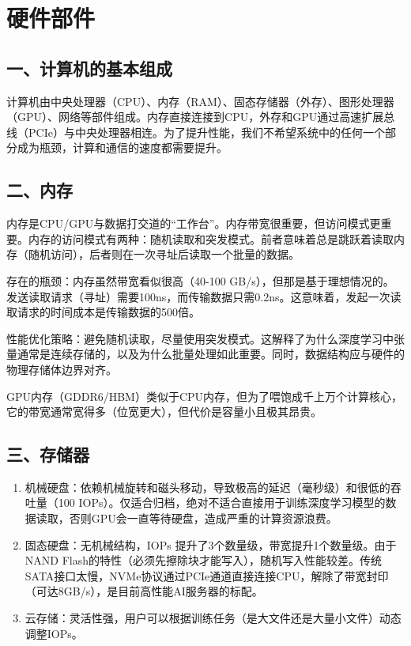 \setcounter{section}{0}

\hypertarget{ux786cux4ef6ux90e8ux4ef6}{%
\section{硬件部件}\label{ux786cux4ef6ux90e8ux4ef6}}

\hypertarget{ux4e00ux8ba1ux7b97ux673aux7684ux57faux672cux7ec4ux6210}{%
\subsection{一、计算机的基本组成}\label{ux4e00ux8ba1ux7b97ux673aux7684ux57faux672cux7ec4ux6210}}

计算机由中央处理器（CPU）、内存（RAM）、固态存储器（外存）、图形处理器（GPU）、网络等部件组成。内存直接连接到CPU，外存和GPU通过高速扩展总线（PCIe）与中央处理器相连。为了提升性能，我们不希望系统中的任何一个部分成为瓶颈，计算和通信的速度都需要提升。

\hypertarget{ux4e8cux5185ux5b58}{%
\subsection{二、内存}\label{ux4e8cux5185ux5b58}}

内存是CPU/GPU与数据打交道的``工作台''。内存带宽很重要，但访问模式更重要。内存的访问模式有两种：随机读取和突发模式。前者意味着总是跳跃着读取内存（随机访问），后者则在一次寻址后读取一个批量的数据。

存在的瓶颈：内存虽然带宽看似很高（40-100 GB/s），但那是基于理想情况的。发送读取请求（寻址）需要100ns，而传输数据只需0.2ns。这意味着，发起一次读取请求的时间成本是传输数据的500倍。

性能优化策略：避免随机读取，尽量使用突发模式。这解释了为什么深度学习中张量通常是连续存储的，以及为什么批量处理如此重要。同时，数据结构应与硬件的物理存储体边界对齐。

GPU内存（GDDR6/HBM）类似于CPU内存，但为了喂饱成千上万个计算核心，它的带宽通常宽得多（位宽更大），但代价是容量小且极其昂贵。

\hypertarget{ux4e09ux5b58ux50a8ux5668}{%
\subsection{三、存储器}\label{ux4e09ux5b58ux50a8ux5668}}

\begin{enumerate}
\def\labelenumi{\arabic{enumi}.}
\item
  机械硬盘：依赖机械旋转和磁头移动，导致极高的延迟（毫秒级）和很低的吞吐量（100 IOPs）。仅适合归档，绝对不适合直接用于训练深度学习模型的数据读取，否则GPU会一直等待硬盘，造成严重的计算资源浪费。
\item
  固态硬盘：无机械结构，IOPs 提升了3个数量级，带宽提升1个数量级。由于NAND Flash的特性（必须先擦除块才能写入），随机写入性能较差。传统SATA接口太慢，NVMe协议通过PCIe通道直接连接CPU，解除了带宽封印（可达8GB/s），是目前高性能AI服务器的标配。
\item
  云存储：灵活性强，用户可以根据训练任务（是大文件还是大量小文件）动态调整IOPs。
\end{enumerate}

